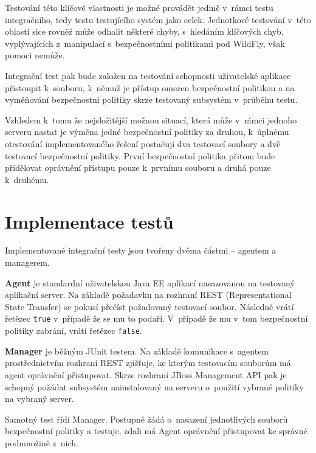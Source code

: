 Testování této klíčové vlastnosti je možné provádět jedině v~rámci testu integračního, tedy testu testujícího systém jako celek.
Jednotkové testování v~této oblasti sice rovněž může odhalit některé chyby, s~hledáním klíčových chyb, vyplývajících z~manipulací s~bezpečnostními politikami pod WildFly, však pomoci nemůže.

Integrační test pak bude založen na testování schopnosti uživatelské aplikace přistoupit k~souboru, k~němuž je přístup omezen bezpečnostní politikou a na vyměňování bezpečnostní politiky skrze testovaný subsystém v~průběhu testu.

Vzhledem k~tomu že nejsložitější možnou situací, která může v~rámci jednoho serveru nastat je výměna jedné bezpečnostní politiky za druhou,
k~úplnému otestování implementovaného řešení postačují dva testovací soubory a dvě testovací bezpečnostní politiky.
První bezpečnostní politika přitom bude přidělovat oprávnění přístupu pouze k~prvnímu souboru a druhá pouze k~druhému.

\section{Implementace testů} %

Implementované integrační testy jsou tvořeny dvěma částmi -- agentem a managerem.

{\bf Agent} je standardní uživatelskou Java EE aplikací nasazovanou na testovaný aplikační server. Na základě požadavku na rozhraní REST (Representational State Transfer) se pokusí přečíst požadovaný testovací soubor. Následně vrátí řetězec {\tt true} v~případě že se mu to podaří. V~případě že mu v~tom bezpečnostní politiky zabrání, vrátí řetězec {\tt false}.

{\bf Manager} je běžným JUnit testem. Na základě komunikace s~agentem prostřednictvím rozhraní REST zjišťuje, ke kterým testovacím souborům má agent oprávnění přistupovat. Skrze rozhraní JBoss Management API pak je schopný požádat subsystém nainstalovaný na serveru o~použití vybrané politiky na vybraný server.

Samotný test řídí Manager. Postupně žádá o~nasazení jednotlivých souborů bezpečnostní politiky a testuje, zdali má Agent oprávnění přistupovat ke správné podmnožině z~nich.

